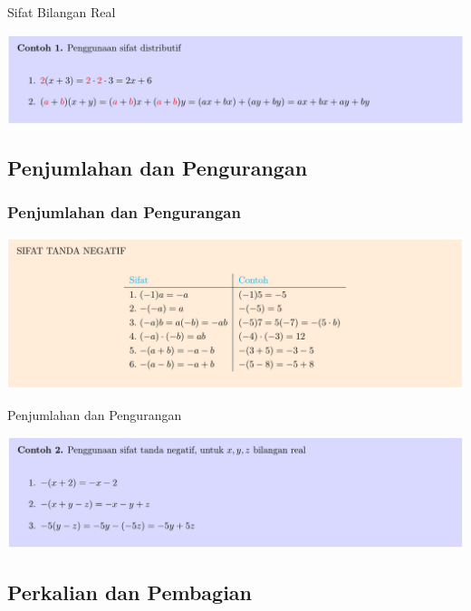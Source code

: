 \documentclass[pdflatex,compress,mathserif]{beamer}
\begin{document}
\begin{frame}{Sifat Bilangan Real}
	\begin{center}
		\includegraphics[width=\linewidth]{img/img06}
	\end{center}
\end{frame}

\subsection{Penjumlahan dan Pengurangan}

\begin{frame}
	\frametitle{Penjumlahan dan Pengurangan}
	\begin{center}
		\includegraphics[width=\linewidth]{img/img07}
	\end{center}
\end{frame}

\begin{frame}{Penjumlahan dan Pengurangan}
	\begin{center}
		\includegraphics[width=\linewidth]{img/img08}
	\end{center}
\end{frame}

\subsection{Perkalian dan Pembagian}
\end{document}
